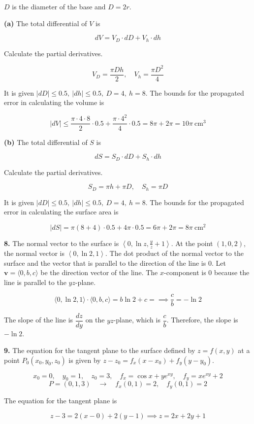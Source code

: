 \documentclass{article}
\begin{document}
$D$ is the diameter of the base and $D=2r$.

\textbf{(a)} The total differential of $V$ is

\[dV=V_D\cdot dD+V_h\cdot dh\]

Calculate the partial derivatives.

\[V_D=\frac{\pi Dh}2,\quad V_h=\frac{\pi D^2}4\]

It is given $\left|dD\right|\leq0.5,\:|dh|\leq0.5,\:D=4,\:h=8$. The bounds for the propagated error in calculating the volume is

\[|dV|\leq\frac{\pi\cdot4\cdot8}2\cdot0.5+\frac{\pi\cdot4^2}4\cdot0.5=8\pi+2\pi=\boxed{10\pi\:\text{cm}^3}\]

\textbf{(b)} The total differential of $S$ is

\[dS=S_D\cdot dD+S_h\cdot dh\]

Calculate the partial derivatives.

\[S_D=\pi h+\pi D,\quad S_h=\pi D\]

It is given $\left|dD\right|\leq0.5,\:|dh|\leq0.5,\:D=4,\:h=8$. The bounds for the propagated error in calculating the surface area is

\[|dS|=\pi\left(8+4\right)\cdot0.5+4\pi\cdot0.5=6\pi+2\pi=\boxed{8\pi\:\text{cm}^2}\]

\newpage

\textbf{8.} The normal vector to the surface is $\left\langle0,\ln z,\frac yz+1\right\rangle$. At the point $(1,0,2)$, the normal vector is $\left\langle0,\ln2,1\right\rangle$. The dot product of the normal vector to the surface and the vector that is parallel to the direction of the line is $0$. Let $\mathbf v=\langle 0,b,c\rangle$ be the direction vector of the line. The $x$-component is $0$ because the line is parallel to the $yz$-plane.

\[\langle0,\ln2,1\rangle\cdot\langle0,b,c\rangle=b\ln2+c=\implies \frac cb=-\ln2\]

The slope of the line is $\dfrac{dz}{dy}$ on the $yz$-plane, which is $\dfrac cb$. Therefore, the slope is $\boxed{-\ln2}$.

\vspace{1em}

\textbf{9.} The equation for the tangent plane to the surface defined by $z=f(x,y)$ at a point $P_0(x_0,y_0,z_0)$ is given by $z-z_0=f_x(x-x_0)+f_y(y-y_0)$.

\[x_0=0,\quad y_0=1,\quad z_0=3,\quad f_x=\cos x+y{e}^{xy},\quad f_y=x{e}^{xy}+2\]
\[P=(0,1,3)\quad\rightarrow\quad f_x(0,1)=2,\quad f_y(0,1)=2\]

The equation for the tangent plane is

\[\boxed{z-3=2(x-0)+2(y-1)\implies z=2x+2y+1}\]
\end{document}
